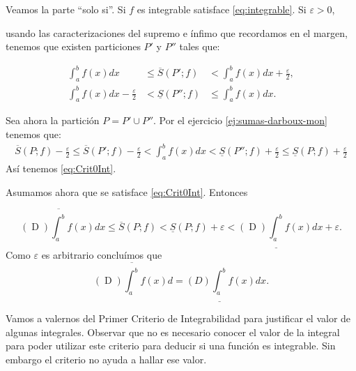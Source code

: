 \begin{demo} Veamos la parte ``solo si''. Si $f$ es integrable satisface \eqref{eq:integrable}. Si $\varepsilon>0$, 

usando las caracterizaciones del supremo e ínfimo que recordamos en el margen,     tenemos que existen particiones $P'$ y $P''$ tales que:


\begin{eqnarray*}
 \int_a^bf(x)dx&\leq \overline{S}(P';f)&<\int_a^bf(x)dx+\frac{\varepsilon}{2},\\
 \int_a^bf(x)dx-\frac{\varepsilon}{2}&<\underline{S}(P'';f)&\leq\int_a^bf(x)dx.
\end{eqnarray*}

Sea ahora la partición $P=P'\cup P''$. Por el ejercicio \eqref{ej:sumas-darboux-mon} tenemos que:
\begin{multline*}
 \overline{S}(P;f)-\frac{\varepsilon}{2}\leq \overline{S}(P';f)-\frac{\varepsilon}{2}<\int_a^bf(x)dx<\underline{S}(P'';f)+\frac{\varepsilon}{2}
 \leq \underline{S}(P;f)+\frac{\varepsilon}{2}
\end{multline*}
Así tenemos \eqref{eq:Crit0Int}. 

Asumamos ahora que se satisface \eqref{eq:Crit0Int}. Entonces 

 \[
   (\mathop{D})\overline{\int_a^b}f(x)dx\leq \overline{S}(P;f)<
   \underline{S}(P;f)+\varepsilon<(\mathop{D})\underline{\int_a^b}f(x)dx +\varepsilon.
 \]
 Como $\varepsilon$ es arbitrario concluímos que  
 \[
   (\mathop{D})\overline{\int_a^b}f(x)d=(D)\underline{\int_a^b}f(x)dx  .
 \] 
\end{demo}


Vamos a valernos del Primer Criterio de Integrabilidad para justificar el valor de  algunas integrales. Observar que no es necesario  conocer el valor de la integral para poder utilizar este  criterio para deducir si una función es integrable. Sin embargo el criterio no ayuda a hallar ese valor.

